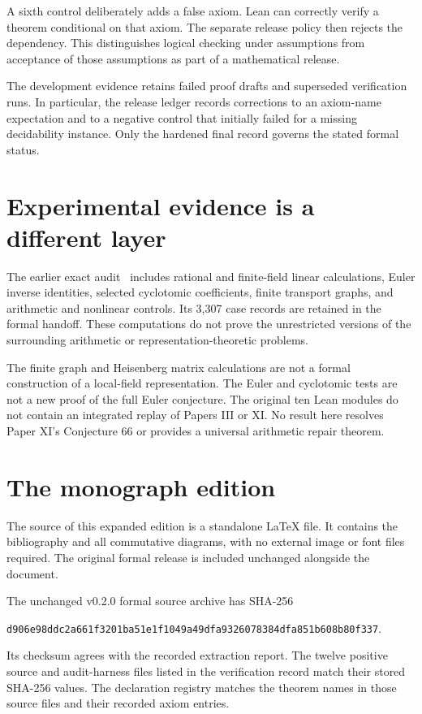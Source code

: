\documentclass[11pt,letterpaper,oneside,openany]{book}
\theoremstyle{quiet}
\begin{document}
A sixth control deliberately adds a false axiom. Lean can correctly verify a theorem conditional on that axiom. The separate release policy then rejects the dependency. This distinguishes logical checking under assumptions from acceptance of those assumptions as part of a mathematical release.

The development evidence retains failed proof drafts and superseded verification runs. In particular, the release ledger records corrections to an axiom-name expectation and to a negative control that initially failed for a missing decidability instance. Only the hardened final record governs the stated formal status.

\section{Experimental evidence is a different layer}
The earlier exact audit~\cite{audit} includes rational and finite-field linear calculations, Euler inverse identities, selected cyclotomic coefficients, finite transport graphs, and arithmetic and nonlinear controls. Its 3,307 case records are retained in the formal handoff. These computations do not prove the unrestricted versions of the surrounding arithmetic or representation-theoretic problems.

The finite graph and Heisenberg matrix calculations are not a formal construction of a local-field representation. The Euler and cyclotomic tests are not a new proof of the full Euler conjecture. The original ten Lean modules do not contain an integrated replay of Papers III or XI. No result here resolves Paper XI's Conjecture 66 or provides a universal arithmetic repair theorem.

\section{The monograph edition}
The source of this expanded edition is a standalone LaTeX file. It contains the bibliography and all commutative diagrams, with no external image or font files required. The original formal release is included unchanged alongside the document.

The unchanged v0.2.0 formal source archive has SHA-256
\begin{center}\footnotesize\nolinkurl{d906e98ddc2a661f3201ba51e1f1049a49dfa9326078384dfa851b608b80f337}.\end{center}
Its checksum agrees with the recorded extraction report. The twelve positive source and audit-harness files listed in the verification record match their stored SHA-256 values. The declaration registry matches the theorem names in those source files and their recorded axiom entries.
\end{document}
